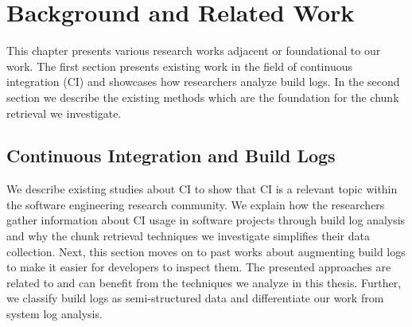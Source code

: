 \documentclass[\myrootdir/main.tex]{subfiles}
\begin{document}
\chapter{Background and Related Work}
\label{sec:rw}
This chapter presents various research works adjacent or foundational to our work.
The first section presents existing work in the field of continuous integration (CI) and showcases how researchers analyze build logs.
In the second section we describe the existing methods which are the foundation for the chunk retrieval we investigate.

\section{Continuous Integration and Build Logs}
We describe existing studies about CI to show that CI is a relevant topic within the software engineering research community.
We explain how the researchers gather information about CI usage in software projects through build log analysis and why the chunk retrieval techniques we investigate simplifies their data collection.
Next, this section moves on to past works about augmenting build logs to make it easier for developers to inspect them.
The presented approaches are related to and can benefit from the techniques we analyze in this thesis.
Further, we classify build logs as semi-structured data and differentiate our work from system log analysis.





\end{document}
